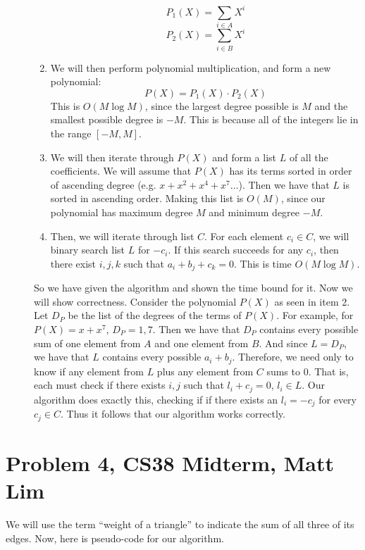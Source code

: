 \documentclass{article}
\begin{document}
\begin{description}
\begin{enumerate}
                \[ P_1(X) = \sum_{i \in A} X^i \]
                \[ P_2(X) = \sum_{i \in B} X^i \]
            \item We will then perform polynomial multiplication, and form a new
                polynomial:
                \[ P(X) = P_1(X) \cdot P_2(X) \]
                This is $O(M \log M)$, since the largest degree possible is $M$
                and the smallest possible degree is $-M$. This is because
                all of the integers lie in the range $[-M, M]$.
            \item We will then iterate through $P(X)$ and form a list $L$ of all
                the coefficients. We will assume that $P(X)$ has its terms
                sorted in order of ascending degree (e.g. $x + x^2 + x^4 + x^7
                \dots$). Then we have that $L$ is sorted in ascending order.
                Making this list is $O(M)$, since our polynomial has maximum
                degree $M$ and minimum degree $-M$.
            \item Then, we will iterate through list $C$. For each element $c_i
                \in C$, we will binary search list $L$ for $-c_i$. If this
                search succeeds for any $c_i$, then there exist $i,j,k$ such that
                $a_i + b_j + c_k = 0$. This is time $O(M \log M)$.
        \end{enumerate}
        So we have given the algorithm and shown the time bound for it. Now we
        will show correctness. Consider the polynomial $P(X)$ as seen in item 2.
        Let $D_P$ be the list of the degrees of the terms of $P(X)$. For
        example, for $P(X) = x + x^7$, $D_P = 1, 7$. Then we have that $D_P$
        contains every possible sum of one element from $A$ and one element from
        $B$. And since $L = D_P$, we have that $L$ contains every possible $a_i
        + b_j$. Therefore, we need only to know
        if any element from $L$ plus any element from $C$ sums to $0$. That is,
        each must check if there exists $i,j$ such that $l_i + c_j = 0$, $l_i
        \in L$. Our algorithm does exactly this, checking if if there exists an
        $l_i = -c_j$ for every $c_j \in C$. Thus it follows that our algorithm
        works correctly.

\end{description}
\newpage

\section*{Problem 4, CS38 Midterm, Matt Lim}
We will use the term ``weight of a triangle'' to indicate the sum of all three
of its edges. Now, here is pseudo-code for our algorithm.
\end{document}
